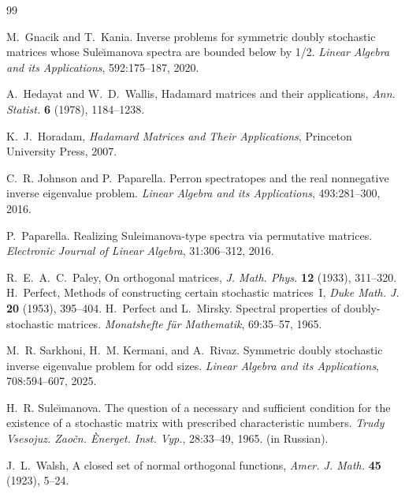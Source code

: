 \documentclass[12pt,fleqn]{amsart}
\theoremstyle{remark}
\newcommand{\1}{\mathbf{1}}
\begin{document}
\begin{thebibliography}{99}

M.~Gnacik and T.~Kania.
\newblock Inverse problems for symmetric doubly stochastic matrices whose {Sule{\u{\i}}manova} spectra are bounded below by 1/2.
\newblock \emph{Linear Algebra and its Applications}, 592:175--187, 2020.

A.~Hedayat and W.~D.~Wallis,
\newblock Hadamard matrices and their applications,
\emph{Ann. Statist.} \textbf{6} (1978), 1184--1238.

K.~J.~Horadam,
\newblock \emph{Hadamard Matrices and Their Applications}, Princeton University Press, 2007.

C.~R. Johnson and P.~Paparella.
\newblock Perron spectratopes and the real nonnegative inverse eigenvalue problem.
\newblock \emph{Linear Algebra and its Applications}, 493:281--300, 2016.

P.~Paparella.
\newblock Realizing {Suleimanova}-type spectra via permutative matrices.
\newblock \emph{Electronic Journal of Linear Algebra}, 31:306--312, 2016.

R.~E.~A.~C.~Paley,
\newblock On orthogonal matrices, \emph{J. Math. Phys.} \textbf{12} (1933), 311--320.
H.~Perfect,
\newblock Methods of constructing certain stochastic matrices~I,
\emph{Duke Math. J.} \textbf{20} (1953), 395--404.
H.~Perfect and L.~Mirsky.
\newblock Spectral properties of doubly-stochastic matrices.
\newblock \emph{Monatshefte f{\"u}r Mathematik}, 69:35--57, 1965.

M.~R. Sarkhoni, H.~M. Kermani, and A.~Rivaz.
\newblock Symmetric doubly stochastic inverse eigenvalue problem for odd sizes.
\newblock \emph{Linear Algebra and its Applications}, 708:594--607, 2025.

H.~R. Sule{\u{\i}}manova.
\newblock The question of a necessary and sufficient condition for the existence of a stochastic matrix with prescribed characteristic numbers.
\newblock \emph{Trudy Vsesojuz. Zaočn. Ènerget. Inst. Vyp.}, 28:33--49, 1965. (in Russian).

J.~L.~Walsh,
\newblock A closed set of normal orthogonal functions, \emph{Amer. J. Math.} \textbf{45} (1923), 5--24.
%
\end{thebibliography}
\end{document}
